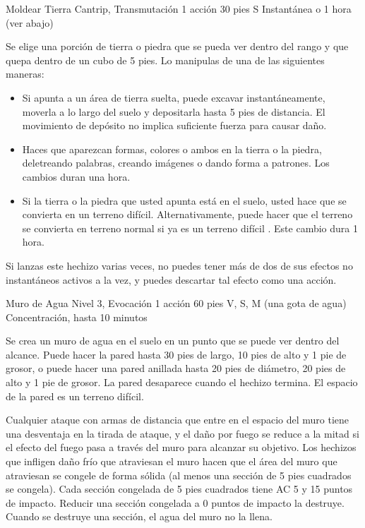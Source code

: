 \documentclass[a4paper,twocolumn,openany,10pt]{dndbook}
\begin{document}
\spellheader%
	{Moldear Tierra}
	{Cantrip, Transmutación}
	{1 acción}
	{30 pies}
	{S}
	{Instantánea o 1 hora (ver abajo)}
	
	Se elige una porción de tierra o piedra que se pueda ver dentro del rango y que quepa dentro de un cubo de 5 pies. Lo manipulas de una de las siguientes maneras:
	
	\begin{itemize}
		\item Si apunta a un área de tierra suelta, puede excavar instantáneamente, moverla a lo largo del suelo y depositarla
		hasta 5 pies de distancia. El movimiento de depósito no implica suficiente fuerza para causar daño.
		
		\item Haces que aparezcan formas, colores o ambos en la tierra o la piedra, deletreando palabras, creando imágenes o
		dando forma a patrones. Los cambios duran una hora.
		
		\item Si la tierra o la piedra que usted apunta está en el suelo, usted hace que se convierta en un terreno difícil.
		Alternativamente, puede hacer que el terreno se convierta en terreno normal si ya es un terreno difícil . Este cambio
		dura 1 hora.
	\end{itemize}
	
	Si lanzas este hechizo varias veces, no puedes tener más de dos de sus efectos no instantáneos activos a la vez, y puedes
	descartar tal efecto como una acción. 

\spellheader%
	{Muro de Agua}
	{Nivel 3, Evocación}
	{1 acción}
	{60 pies}
	{V, S, M (una gota de agua)}
	{Concentración, hasta 10 minutos}
	
	Se crea un muro de agua en el suelo en un punto que se puede ver dentro del alcance. Puede hacer la pared hasta 30 pies de
	largo, 10 pies de alto y 1 pie de grosor, o puede hacer una pared anillada hasta 20 pies de diámetro, 20 pies de alto y 1
	pie de grosor. La pared desaparece cuando el hechizo termina. El espacio de la pared es un terreno difícil.
	
	Cualquier ataque con armas de distancia que entre en el espacio del muro tiene una desventaja en la tirada de ataque, y el
	daño por fuego se reduce a la mitad si el efecto del fuego pasa a través del muro para alcanzar su objetivo. Los hechizos
	que infligen daño frío que atraviesan el muro hacen que el área del muro que atraviesan se congele de forma sólida (al menos
	una sección de 5 pies cuadrados se congela). Cada sección congelada de 5 pies cuadrados tiene AC 5 y 15 puntos de impacto.
	Reducir una sección congelada a 0 puntos de impacto la destruye. Cuando se destruye una sección, el agua del muro no la
	llena. 
\end{document}
